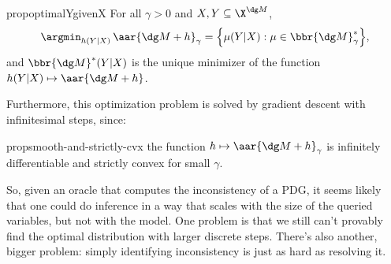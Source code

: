 \begin{linked}{prop}{optimalYgivenX}
For all $\gamma > 0$ and $X, Y \subseteq \X^{\dg M}$,
	$$\displaystyle
		\argmin_{h(Y|X)}\,
        \aar{\dg M + h}_\gamma =
		\Big\{ \mu(Y | X) :  \mu \in \bbr{\dg M}_\gamma^* \Big\}
	,$$
and
	$\displaystyle
		\bbr{\dg M}^*(Y | X)
	$ is the unique minimizer of the function
$
    h(Y|X) \mapsto \aar{\dg M + h}
$.
\end{linked}
Furthermore, this optimization problem is solved by
gradient descent with infinitesimal steps,
since:
\begin{linked}{prop}{smooth-and-strictly-cvx}
    the function $h \mapsto \aar{\dg M + h}_\gamma$
    is infinitely differentiable
    and strictly convex for small $\gamma$.
\end{linked}
%
%
%
So, given an oracle that computes the inconsistency of a PDG,
it seems likely that one could do inference in a way that scales with the size of the queried variables, but not with the model.
%
One problem is that we still can't provably find the optimal distribution with larger discrete steps.
There's also another, bigger problem: simply identifying inconsistency is just as hard as resolving it.

